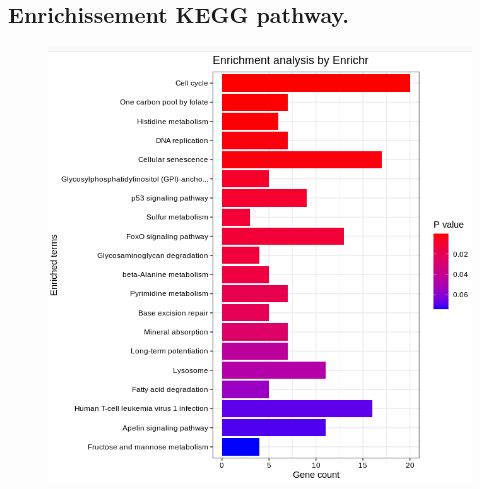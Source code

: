\documentclass{style}
\begin{document}
\subsection{Enrichissement KEGG pathway.}\label{appendix:barplotenri}
\begin{figure}[H]
    \centering
    \includegraphics[width=16cm]{images/figures/kegg.png}
\end{figure}
\end{document}
